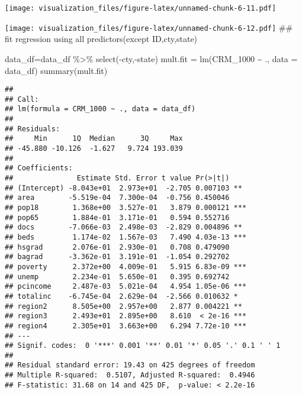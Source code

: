\documentclass[
]{article}
\newenvironment{Shaded}{\begin{snugshade}}{\end{snugshade}}
\newcommand{\AttributeTok}[1]{\textcolor[rgb]{0.77,0.63,0.00}{#1}}
\newcommand{\FunctionTok}[1]{\textcolor[rgb]{0.00,0.00,0.00}{#1}}
\newcommand{\NormalTok}[1]{#1}
\newcommand{\OtherTok}[1]{\textcolor[rgb]{0.56,0.35,0.01}{#1}}
\newcommand{\SpecialCharTok}[1]{\textcolor[rgb]{0.00,0.00,0.00}{#1}}
\begin{document}
\texttt{[image: visualization\_files/figure-latex/unnamed-chunk-6-11.pdf]}

\begin{Shaded}
\end{Shaded}

\texttt{[image: visualization\_files/figure-latex/unnamed-chunk-6-12.pdf]}
\#\# fit regression using all predictors(except ID,cty,state)

\begin{Shaded}
\begin{Highlighting}[]
\NormalTok{data\_df}\OtherTok{=}\NormalTok{data\_df }\SpecialCharTok{\%\textgreater{}\%} 
  \FunctionTok{select}\NormalTok{(}\SpecialCharTok{{-}}\NormalTok{cty,}\SpecialCharTok{{-}}\NormalTok{state)}
\NormalTok{mult.fit }\OtherTok{=} \FunctionTok{lm}\NormalTok{(CRM\_1000 }\SpecialCharTok{\textasciitilde{}}\NormalTok{ ., }\AttributeTok{data =}\NormalTok{ data\_df)}
\FunctionTok{summary}\NormalTok{(mult.fit)}
\end{Highlighting}
\end{Shaded}

\begin{verbatim}
## 
## Call:
## lm(formula = CRM_1000 ~ ., data = data_df)
## 
## Residuals:
##     Min      1Q  Median      3Q     Max 
## -45.880 -10.126  -1.627   9.724 193.039 
## 
## Coefficients:
##               Estimate Std. Error t value Pr(>|t|)    
## (Intercept) -8.043e+01  2.973e+01  -2.705 0.007103 ** 
## area        -5.519e-04  7.300e-04  -0.756 0.450046    
## pop18        1.368e+00  3.527e-01   3.879 0.000121 ***
## pop65        1.884e-01  3.171e-01   0.594 0.552716    
## docs        -7.066e-03  2.498e-03  -2.829 0.004896 ** 
## beds         1.174e-02  1.567e-03   7.490 4.03e-13 ***
## hsgrad       2.076e-01  2.930e-01   0.708 0.479090    
## bagrad      -3.362e-01  3.191e-01  -1.054 0.292702    
## poverty      2.372e+00  4.009e-01   5.915 6.83e-09 ***
## unemp        2.234e-01  5.650e-01   0.395 0.692742    
## pcincome     2.487e-03  5.021e-04   4.954 1.05e-06 ***
## totalinc    -6.745e-04  2.629e-04  -2.566 0.010632 *  
## region2      8.505e+00  2.957e+00   2.877 0.004221 ** 
## region3      2.493e+01  2.895e+00   8.610  < 2e-16 ***
## region4      2.305e+01  3.663e+00   6.294 7.72e-10 ***
## ---
## Signif. codes:  0 '***' 0.001 '**' 0.01 '*' 0.05 '.' 0.1 ' ' 1
## 
## Residual standard error: 19.43 on 425 degrees of freedom
## Multiple R-squared:  0.5107, Adjusted R-squared:  0.4946 
## F-statistic: 31.68 on 14 and 425 DF,  p-value: < 2.2e-16
\end{verbatim}
\end{document}
